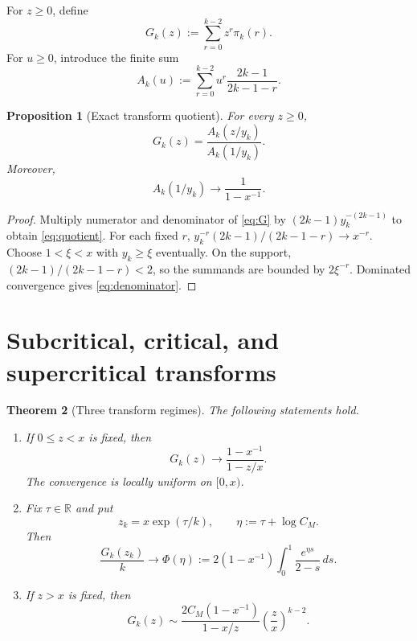 \documentclass[11pt]{article}
\newtheorem{theorem}{Theorem}[section]
\newtheorem{proposition}[theorem]{Proposition}
\theoremstyle{remark}
\begin{document}
For $z\ge0$, define
\begin{equation}\label{eq:G}
 G_k(z):=\sum_{r=0}^{k-2}z^r\pi_k(r).
\end{equation}
For $u\ge0$, introduce the finite sum
\begin{equation}\label{eq:A}
 A_k(u):=\sum_{r=0}^{k-2}u^r\frac{2k-1}{2k-1-r}.
\end{equation}

\begin{proposition}[Exact transform quotient]\label{prop:quotient}
For every $z\ge0$,
\begin{equation}\label{eq:quotient}
 \boxed{G_k(z)=\frac{A_k(z/y_k)}{A_k(1/y_k)}.}
\end{equation}
Moreover,
\begin{equation}\label{eq:denominator}
 A_k(1/y_k)\longrightarrow\frac1{1-x^{-1}}.
\end{equation}
\end{proposition}

\begin{proof}
Multiply numerator and denominator of \eqref{eq:G} by
$(2k-1)y_k^{-(2k-1)}$ to obtain \eqref{eq:quotient}.  For each fixed $r$,
$y_k^{-r}(2k-1)/(2k-1-r)\to x^{-r}$.  Choose $1<\xi<x$ with $y_k\ge\xi$
eventually.  On the support, $(2k-1)/(2k-1-r)<2$, so the summands are bounded
by $2\xi^{-r}$.  Dominated convergence gives \eqref{eq:denominator}.
\end{proof}

\section{Subcritical, critical, and supercritical transforms}

\begin{theorem}[Three transform regimes]\label{thm:three-regimes}
The following statements hold.
\begin{enumerate}
\item If $0\le z<x$ is fixed, then
\begin{equation}\label{eq:subcritical}
 \boxed{G_k(z)\longrightarrow
 \frac{1-x^{-1}}{1-z/x}.}
\end{equation}
The convergence is locally uniform on $[0,x)$.
\item Fix $\tau\in\mathbb R$ and put
\begin{equation}\label{eq:critical-z}
 z_k=x\exp(\tau/k),
 \qquad \eta:=\tau+\log C_M.
\end{equation}
Then
\begin{equation}\label{eq:critical}
 \boxed{
 \frac{G_k(z_k)}k\longrightarrow
 \Phi(\eta):=
 2(1-x^{-1})\int_0^1\frac{e^{\eta s}}{2-s}\,ds.}
\end{equation}
\item If $z>x$ is fixed, then
\begin{equation}\label{eq:supercritical}
 \boxed{
 G_k(z)\sim
 \frac{2C_M(1-x^{-1})}{1-x/z}
 \left(\frac zx\right)^{k-2}.}
\end{equation}
\end{enumerate}
\end{theorem}
\end{document}
